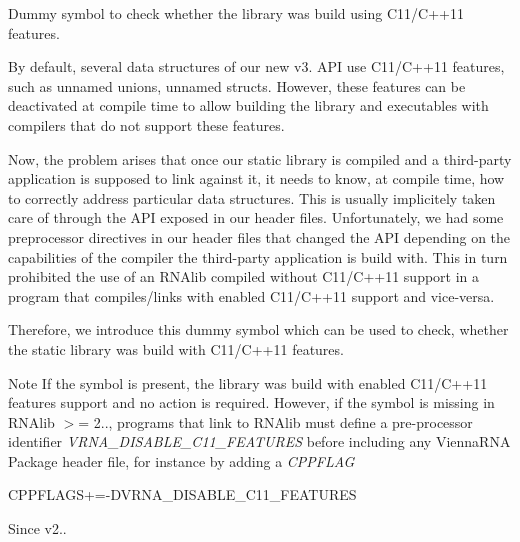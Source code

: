Dummy symbol to check whether the library was build using C11/\+C++11 features. 

By default, several data structures of our new v3. A\+PI use C11/\+C++11 features, such as unnamed unions, unnamed structs. However, these features can be deactivated at compile time to allow building the library and executables with compilers that do not support these features.

Now, the problem arises that once our static library is compiled and a third-\/party application is supposed to link against it, it needs to know, at compile time, how to correctly address particular data structures. This is usually implicitely taken care of through the A\+PI exposed in our header files. Unfortunately, we had some preprocessor directives in our header files that changed the A\+PI depending on the capabilities of the compiler the third-\/party application is build with. This in turn prohibited the use of an R\+N\+Alib compiled without C11/\+C++11 support in a program that compiles/links with enabled C11/\+C++11 support and vice-\/versa.

Therefore, we introduce this dummy symbol which can be used to check, whether the static library was build with C11/\+C++11 features.

\begin{DoxyNote}{Note}
If the symbol is present, the library was build with enabled C11/\+C++11 features support and no action is required. However, if the symbol is missing in R\+N\+Alib $>$= 2.., programs that link to R\+N\+Alib must define a pre-\/processor identifier {\itshape V\+R\+N\+A\+\_\+\+D\+I\+S\+A\+B\+L\+E\+\_\+\+C11\+\_\+\+F\+E\+A\+T\+U\+R\+ES} before including any Vienna\+R\+NA Package header file, for instance by adding a {\itshape C\+P\+P\+F\+L\+AG} 
\begin{DoxyCode}
CPPFLAGS+=-DVRNA\_DISABLE\_C11\_FEATURES
\end{DoxyCode}

\end{DoxyNote}
\begin{DoxySince}{Since}
v2.. 
\end{DoxySince}
